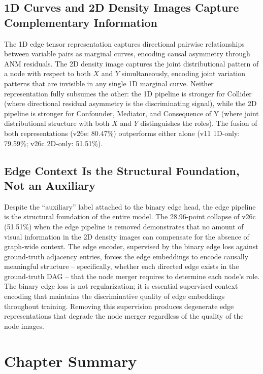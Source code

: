 \subsection{1D Curves and 2D Density Images Capture Complementary Information}

The 1D edge tensor representation captures directional pairwise relationships between variable pairs as marginal curves, encoding causal asymmetry through ANM residuals. The 2D density image captures the joint distributional pattern of a node with respect to both $X$ and $Y$ simultaneously, encoding joint variation patterns that are invisible in any single 1D marginal curve. Neither representation fully subsumes the other: the 1D pipeline is stronger for Collider (where directional residual asymmetry is the discriminating signal), while the 2D pipeline is stronger for Confounder, Mediator, and Consequence of Y (where joint distributional structure with both $X$ and $Y$ distinguishes the roles). The fusion of both representations (v26e: 80.47\%) outperforms either alone (v11 1D-only: 79.59\%; v26c 2D-only: 51.51\%).

\subsection{Edge Context Is the Structural Foundation, Not an Auxiliary}

Despite the ``auxiliary'' label attached to the binary edge head, the edge pipeline is the structural foundation of the entire model. The 28.96-point collapse of v26c (51.51\%) when the edge pipeline is removed demonstrates that no amount of visual information in the 2D density images can compensate for the absence of graph-wide context. The edge encoder, supervised by the binary edge loss against ground-truth adjacency entries, forces the edge embeddings to encode causally meaningful structure -- specifically, whether each directed edge exists in the ground-truth DAG -- that the node merger requires to determine each node's role. The binary edge loss is not regularization; it is essential supervised context encoding that maintains the discriminative quality of edge embeddings throughout training. Removing this supervision produces degenerate edge representations that degrade the node merger regardless of the quality of the node images.

\section*{Chapter Summary}

